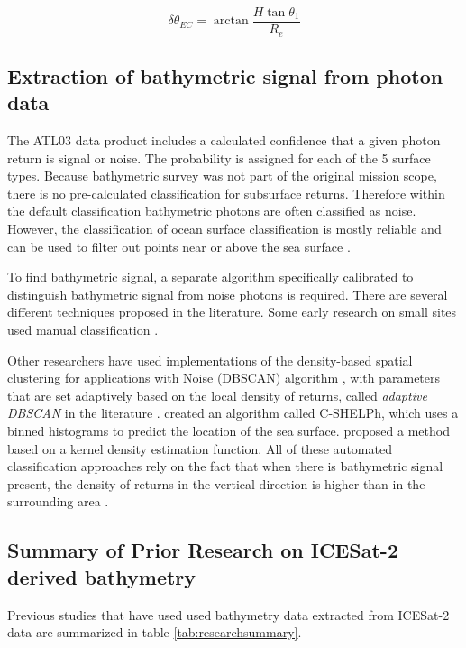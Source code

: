 \begin{equation}
      \delta \theta_{EC} = \arctan{\frac{H \tan{\theta_1}}{R_e}}
\end{equation}


\subsection{Extraction of bathymetric signal from photon data}\label{subsec:signal-finding}
The ATL03 data product includes a calculated confidence that a given photon return is signal or noise. The probability is assigned for each of the 5 surface types. Because bathymetric survey was not part of the original mission scope, there is no pre-calculated classification for subsurface returns. Therefore within the default classification bathymetric photons are often classified as noise. However, the classification of ocean surface classification is mostly reliable and can be used to filter out points near or above the sea surface \parencite{Ranndal2021}.

To find bathymetric signal, a separate algorithm specifically calibrated to distinguish bathymetric signal from noise photons is required. There are several different techniques proposed in the literature. Some early research on small sites used manual classification \parencite{Forfinski-Sarkozi2016,Thomas2021d,Babbel2021a,Albright2021}.

Other researchers have used implementations of the density-based spatial clustering for applications with Noise (DBSCAN) algorithm \parencite{Ester1996}, with parameters that are set adaptively based on the local density of returns, called \emph{adaptive DBSCAN} in the literature \parencite{Ma2020,Xie2021,LeQuilleuc2022b,Liu2021}.  \citeauthor{Thomas2022} created an algorithm called C-SHELPh, which uses a binned histograms to predict the location of the sea surface. \cite{Datta2021} proposed a method based on a kernel density estimation function. All of these automated classification approaches rely on the fact that when there is bathymetric signal present, the density of returns in the vertical direction is higher than in the surrounding area \parencite{Neuenschwander2019}.


\subsection{Summary of Prior Research on ICESat-2 derived bathymetry} %

Previous studies that have used used bathymetry data extracted from ICESat-2 data are summarized in table \ref{tab:researchsummary}.


